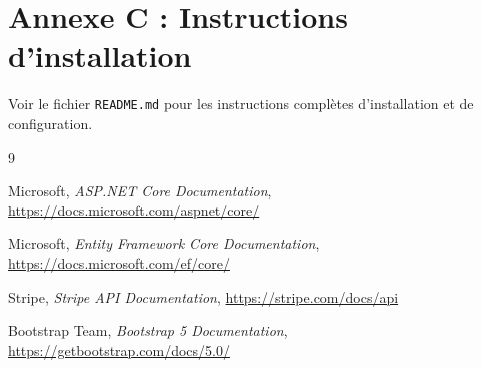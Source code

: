 \documentclass[12pt,a4paper]{article}
\begin{document}
\section{Annexe C : Instructions d'installation}

Voir le fichier \texttt{README.md} pour les instructions complètes d'installation et de configuration.

\begin{thebibliography}{9}

Microsoft,
\textit{ASP.NET Core Documentation},
\url{https://docs.microsoft.com/aspnet/core/}

Microsoft,
\textit{Entity Framework Core Documentation},
\url{https://docs.microsoft.com/ef/core/}

Stripe,
\textit{Stripe API Documentation},
\url{https://stripe.com/docs/api}

Bootstrap Team,
\textit{Bootstrap 5 Documentation},
\url{https://getbootstrap.com/docs/5.0/}

\end{thebibliography}
\end{document}
